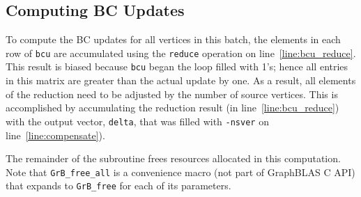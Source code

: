 \subsection{Computing BC Updates}

To compute the BC updates for all vertices in this batch, 
the elements in each row of {\tt bcu} are accumulated using the {\tt reduce} 
operation on line~\ref{line:bcu_reduce}.  This result is biased because 
{\tt bcu} began the loop filled with 1's; hence all entries in this matrix are
greater than the actual update by one.  As a result, all elements of the reduction 
need to be adjusted by the number of source vertices.  This is accomplished by
accumulating the reduction result (in line~\ref{line:bcu_reduce}) with the output
vector, {\tt delta}, that was filled with {\tt -nsver} on line~\ref{line:compensate}).

The remainder of the subroutine frees resources allocated
in this computation.  Note that {\tt GrB\_free\_all} is a convenience macro (not part of GraphBLAS C API) that 
expands to {\tt GrB\_free} for each of its parameters.
